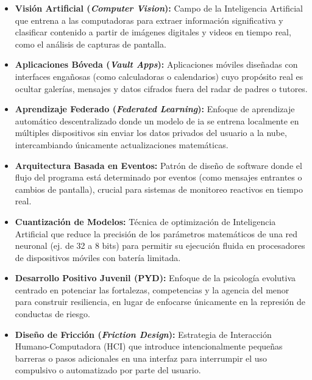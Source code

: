 \begin{itemize}
    \item[] \textbf{Visión Artificial (\textit{Computer Vision}):} Campo de la Inteligencia Artificial que entrena a las computadoras para extraer información significativa y clasificar contenido a partir de imágenes digitales y videos en tiempo real, como el análisis de capturas de pantalla.

    \item[] \textbf{Aplicaciones Bóveda (\textit{Vault Apps}):} Aplicaciones móviles diseñadas con interfaces engañosas (como calculadoras o calendarios) cuyo propósito real es ocultar galerías, mensajes y datos cifrados fuera del radar de padres o tutores. \\

    \item[] \textbf{Aprendizaje Federado (\textit{Federated Learning}):} Enfoque de aprendizaje automático descentralizado donde un modelo de \gls{ia} se entrena localmente en múltiples dispositivos sin enviar los datos privados del usuario a la nube, intercambiando únicamente actualizaciones matemáticas. \\

    \item[] \textbf{Arquitectura Basada en Eventos:} Patrón de diseño de software donde el flujo del programa está determinado por eventos (como mensajes entrantes o cambios de pantalla), crucial para sistemas de monitoreo reactivos en tiempo real. \\

    \item[] \textbf{Cuantización de Modelos:} Técnica de optimización de Inteligencia Artificial que reduce la precisión de los parámetros matemáticos de una red neuronal (ej. de 32 a 8 bits) para permitir su ejecución fluida en procesadores de dispositivos móviles con batería limitada. \\

    \item[] \textbf{Desarrollo Positivo Juvenil (PYD):} Enfoque de la psicología evolutiva centrado en potenciar las fortalezas, competencias y la agencia del menor para construir resiliencia, en lugar de enfocarse únicamente en la represión de conductas de riesgo. \\

    \item[] \textbf{Diseño de Fricción (\textit{Friction Design}):} Estrategia de Interacción Humano-Computadora (HCI) que introduce intencionalmente pequeñas barreras o pasos adicionales en una interfaz para interrumpir el uso compulsivo o automatizado por parte del usuario. \\


\end{itemize}
